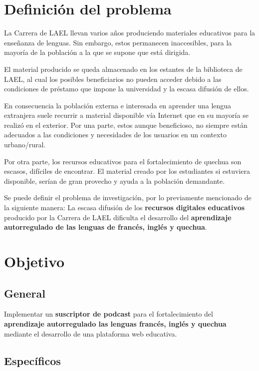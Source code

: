 \section{Definición del problema}

La Carrera de LAEL llevan varios años produciendo materiales educativos para la
enseñanza de lenguas. Sin embargo, estos permanecen inaccesibles, para la
mayoría de la población a la que se supone que está dirigida. 

El material producido se queda almacenado en los estantes de la biblioteca
de LAEL, al cual los posibles beneficiarios no pueden acceder debido a las
condiciones de préstamo que impone la universidad y la escasa difusión de
ellos. 

En consecuencia la población externa e interesada en aprender una lengua
extranjera suele recurrir a material disponible vía Internet que en su
mayoría se realizó en el exterior. Por una parte, estos aunque beneficioso,
no siempre están adecuados a las condiciones y necesidades de los usuarios
en un contexto urbano/rural.

Por otra parte, los recursos educativos para el fortalecimiento de quechua
son escasos, difíciles de encontrar. El material creado por los estudiantes
si estuviera disponible, serían de gran provecho y ayuda a la población
demandante.
 				
Se puede definir el problema de investigación, por lo previamente mencionado
de la siguiente manera: La escasa difusión de los \textbf{recursos digitales
educativos} producido por la Carrera de LAEL dificulta el desarrollo del 
\textbf{aprendizaje autorregulado de las lenguas de francés, inglés y quechua}.

\section{Objetivo}

\subsection{General}

Implementar un \textbf{suscriptor de podcast} para el fortalecimiento del 
\textbf{aprendizaje autorregulado las lenguas francés, inglés y quechua} mediante
el desarrollo de una plataforma web educativa.

\subsection{Específicos}

